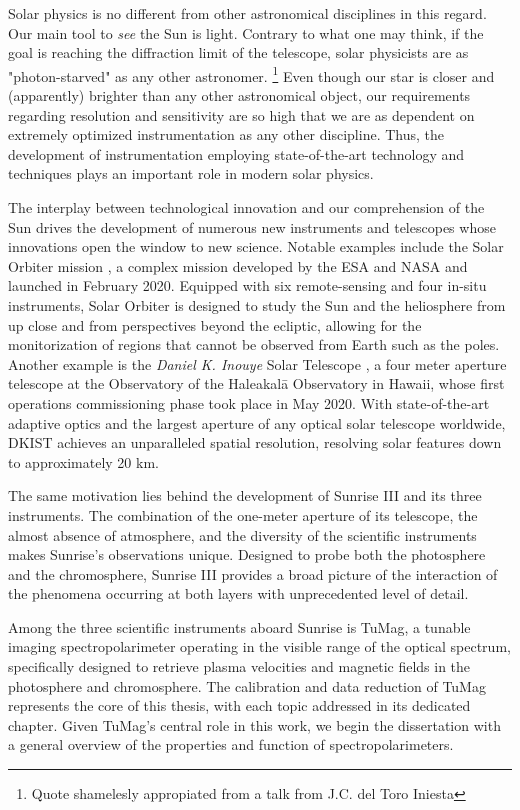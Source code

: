Solar physics is no different from other astronomical disciplines in this regard. Our main tool to \textit{see} the Sun is light. Contrary to what one may think, if the goal is reaching the diffraction limit of the telescope, solar physicists are as "photon-starved" as any other astronomer. \footnote{Quote shamelesly appropiated from a talk from J.C. del Toro Iniesta} Even though our star is closer and (apparently) brighter than any other astronomical object, our requirements regarding resolution and sensitivity are so high that we are as dependent on extremely optimized instrumentation as any other discipline. Thus, the development of instrumentation employing state-of-the-art technology and techniques plays an important role in modern solar physics.

The interplay between technological innovation and our comprehension of the Sun drives the development of numerous new instruments and telescopes whose innovations open the window to new science. Notable examples include the Solar Orbiter mission \citep{SO}, a complex mission developed by the ESA and NASA and launched in February 2020. Equipped with six remote-sensing and four in-situ instruments, Solar Orbiter is designed to study the Sun and the heliosphere from up close and from perspectives beyond the ecliptic, allowing for the monitorization of regions that cannot be observed from Earth such as the poles. Another example is the \textit{Daniel K. Inouye} Solar Telescope \citep[DKIST;][]{DKIST}, a four meter aperture telescope at the Observatory of the Haleakal\=a Observatory in Hawaii, whose first operations commissioning phase took place in May 2020. With state-of-the-art adaptive optics and the largest aperture of any optical solar telescope worldwide, DKIST achieves an unparalleled spatial resolution, resolving solar features down to approximately 20 km. 

The same motivation lies behind the development of Sunrise III and its three instruments. The combination of the one-meter aperture of its telescope, the almost absence of atmosphere, and the diversity of the scientific instruments makes Sunrise's observations unique. Designed to probe both the photosphere and the chromosphere, Sunrise III provides a broad picture of the interaction of the phenomena occurring at both layers with unprecedented level of detail.

Among the three scientific instruments aboard Sunrise is TuMag, a tunable imaging spectropolarimeter operating in the visible range of the optical spectrum, specifically designed to retrieve plasma velocities and magnetic fields in the photosphere and chromosphere. The calibration and data reduction of TuMag represents the core of this thesis, with each topic addressed in its dedicated chapter. Given TuMag’s central role in this work, we begin the dissertation with a general overview of the properties and function of spectropolarimeters.


